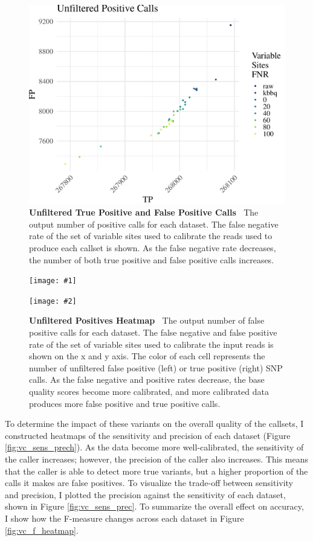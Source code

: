 \documentclass{report}
\newcommand{\titlecaption}[2]{\caption[#1]{\textbf{#1 \textbar\,} #2}}
\newcommand{\includetwo}[2]{\begin{minipage}{.475\textwidth}%
\texttt{[image: \#1]}%
\end{minipage}\hfill\begin{minipage}{.475\textwidth}%
\texttt{[image: \#2]}%
\end{minipage}}
\begin{document}
\begin{figure}
\centering
\includegraphics[width = .8\textwidth]{tp_fp_plot.pdf}
\titlecaption{Unfiltered True Positive and False Positive Calls}{The output number of positive calls for each dataset. The false negative rate of the set of variable sites used to calibrate the reads used to produce each callset is shown. As the false negative rate decreases, the number of both true positive and false positive calls increases.}
\label{fig:vc_fptp}
\end{figure}

\begin{figure}
\centering
\includetwo{fp_heatmap.pdf}{tp_heatmap.pdf}
\titlecaption{Unfiltered Positives Heatmap}{The output number of false positive calls for each dataset. The false negative and false positive rate of the set of variable sites used to calibrate the input reads is shown on the x and y axis. The color of each cell represents the number of unfiltered false positive (left) or true positive (right) SNP calls. As the false negative and positive rates decrease, the base quality scores become more calibrated, and more calibrated data produces more false positive and true positive calls.}
\label{fig:vc_p}
\end{figure}

\begin{outline}
\item To determine the impact of these variants on the overall quality of the callsets, I constructed heatmaps of the sensitivity and precision of each dataset (Figure \ref{fig:vc_sens_prech}). As the data become more well-calibrated, the sensitivity of the caller increases; however, the precision of the caller also increases. This means that the caller is able to detect more true variants, but a higher proportion of the calls it makes are false positives. To visualize the trade-off between sensitivity and precision, I plotted the precision against the sensitivity of each dataset, shown in Figure \ref{fig:vc_sens_prec}. To summarize the overall effect on accuracy, I show how the F-measure changes across each dataset in Figure \ref{fig:vc_f_heatmap}.
\end{outline}
\end{document}
